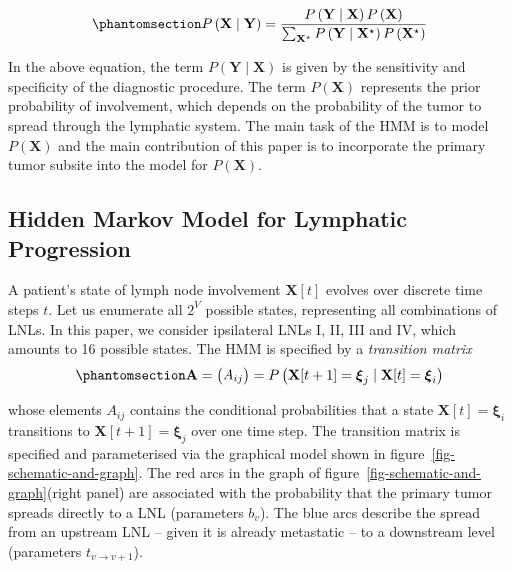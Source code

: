 \documentclass[11pt,twocolumn,twoside]{article}
\begin{document}
\begin{equation}\phantomsection\label{eq-bayes-law}{
P \left( \mathbf{X} \mid \mathbf{Y} \right) = \frac{P \left( \mathbf{Y} \mid \mathbf{X} \right) P \left( \mathbf{X} \right)}{\sum_{\mathbf{X}^\star} P \left( \mathbf{Y} \mid \mathbf{X}^\star \right) P \left( \mathbf{X}^\star \right)}
}\end{equation}

In the above equation, the term
\(P \left( \mathbf{Y} \mid \mathbf{X} \right)\) is given by the sensitivity and specificity of the diagnostic procedure. The term \(P \left( \mathbf{X} \right)\) represents the prior probability of involvement, which depends on the probability of the tumor to spread through the lymphatic system. The main task of the HMM is to model
\(P \left( \mathbf{X} \right)\) and the main contribution of this paper is to incorporate the primary tumor subsite into the model for
\(P \left( \mathbf{X} \right)\).

\subsection{Hidden Markov Model for Lymphatic
Progression}\label{sec-hmm}

A patient's state of lymph node involvement \(\mathbf{X}[t]\) evolves
over discrete time steps \(t\). Let us enumerate all \(2^V\) possible
states, representing all combinations of LNLs. In this paper, we
consider ipsilateral LNLs I, II, III and IV, which amounts to 16
possible states. The HMM is specified by a \emph{transition matrix}
\begin{equation}\phantomsection\label{eq-transition-matrix}{
\mathbf{A} = \begin{pmatrix} A_{ij} \end{pmatrix} = P \left( \mathbf{X}[t+1] = \boldsymbol{\xi}_j \mid \mathbf{X}[t] = \boldsymbol{\xi}_i \right)
}\end{equation}

whose elements \(A_{ij}\) contains the conditional probabilities that a state
\(\mathbf{X}[t]=\boldsymbol{\xi}_i\) transitions to
\(\mathbf{X}[t+1]=\boldsymbol{\xi}_j\) over one time step. The
transition matrix is specified and parameterised via the graphical model
shown in figure~\ref{fig-schematic-and-graph}. The red arcs in the graph
of figure~\ref{fig-schematic-and-graph}(right panel) are associated with the probability that the primary tumor spreads directly to a LNL (parameters \(b_v\)).
The blue arcs describe the spread from an upstream LNL -- given it is
already metastatic -- to a downstream level (parameters
\(t_{v \rightarrow v+1}\)). \\
\end{document}
